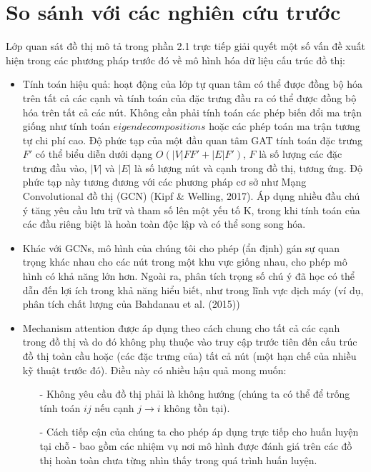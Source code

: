 \section{So sánh với các nghiên cứu trước}
\label{sec:So sánh với các nghiên cứu trước}
Lớp quan sát đồ thị mô tả trong phần 2.1 trực tiếp giải quyết một số vấn đề xuất hiện trong các phương pháp trước đó về mô hình hóa dữ liệu cấu trúc đồ thị:
	\begin{itemize}
		\item Tính toán hiệu quả: hoạt động của lớp tự quan tâm có thể được đồng bộ hóa trên tất cả các cạnh và tính toán của đặc trưng đầu ra có thể được đồng bộ hóa trên tất cả các nút. Không cần phải tính toán các phép biến đổi ma trận giống như tính toán $eigendecompositions$ hoặc các phép toán ma trận tương tự chi phí cao. Độ phức tạp của một đầu quan tâm GAT tính toán đặc trưng $F'$ có thể biểu diễn dưới dạng $O(|V|F F' + |E|F')$, $F$ là số lượng các đặc trưng đầu vào, $|V|$ và $|E|$ là số lượng nút và cạnh trong đồ thị, tương ứng. Độ phức tạp này tương đương với các phương pháp cơ sở như Mạng Convolutional đồ thị (GCN) (Kipf \& Welling, 2017). Áp dụng nhiều đầu chú ý tăng yêu cầu lưu trữ và tham số lên một yếu tố K, trong khi tính toán của các đầu riêng biệt là hoàn toàn độc lập và có thể song song hóa.
		
		\item Khác với GCNs, mô hình của chúng tôi cho phép (ẩn định) gán sự quan trọng khác nhau cho các nút trong một khu vực giống nhau, cho phép mô hình có khả năng lớn hơn. Ngoài ra, phân tích trọng số chú ý đã học có thể dẫn đến lợi ích trong khả năng hiểu biết, như trong lĩnh vực dịch máy (ví dụ, phân tích chất lượng của Bahdanau et al. (2015))
		
		\item Mechanism attention được áp dụng theo cách chung cho tất cả các cạnh trong đồ thị và do đó không phụ thuộc vào truy cập trước tiên đến cấu trúc đồ thị toàn cầu hoặc (các đặc trưng của) tất cả nút (một hạn chế của nhiều kỹ thuật trước đó). Điều này có nhiều hậu quả mong muốn:
			\begin{itemize}
				\item[-] Không yêu cầu đồ thị phải là không hướng (chúng ta có thể để trống tính toán $ij$ nếu cạnh 
				\(j \longrightarrow i\)
				không tồn tại).
				
				\item[-] Cách tiếp cận của chúng ta cho phép áp dụng trực tiếp cho huấn luyện tại chỗ - bao gồm các nhiệm vụ nơi mô hình được đánh giá trên các đồ thị hoàn toàn chưa từng nhìn thấy trong quá trình huấn luyện.
			\end{itemize}
		

\end{itemize}
